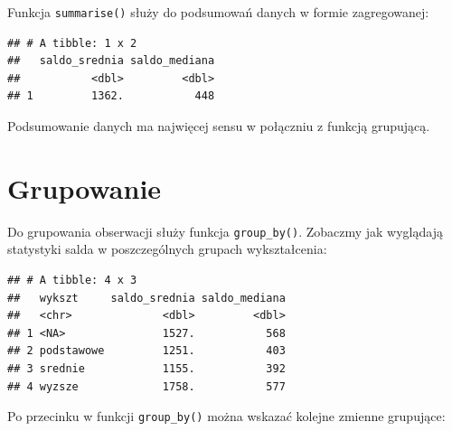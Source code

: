 \documentclass[]{book}
\newenvironment{Shaded}{\begin{snugshade}}{\end{snugshade}}
\newcommand{\KeywordTok}[1]{\textcolor[rgb]{0.13,0.29,0.53}{\textbf{#1}}}
\newcommand{\DataTypeTok}[1]{\textcolor[rgb]{0.13,0.29,0.53}{#1}}
\newcommand{\StringTok}[1]{\textcolor[rgb]{0.31,0.60,0.02}{#1}}
\newcommand{\OperatorTok}[1]{\textcolor[rgb]{0.81,0.36,0.00}{\textbf{#1}}}
\newcommand{\NormalTok}[1]{#1}
\begin{document}
Funkcja \texttt{summarise()} służy do podsumowań danych w formie
zagregowanej:

\begin{Shaded}
\end{Shaded}

\begin{verbatim}
## # A tibble: 1 x 2
##   saldo_srednia saldo_mediana
##           <dbl>         <dbl>
## 1         1362.           448
\end{verbatim}

Podsumowanie danych ma najwięcej sensu w połączniu z funkcją grupującą.

\section{Grupowanie}\label{grupowanie}

Do grupowania obserwacji służy funkcja \texttt{group\_by()}. Zobaczmy
jak wyglądają statystyki salda w poszczególnych grupach wykształcenia:

\begin{Shaded}
\end{Shaded}

\begin{verbatim}
## # A tibble: 4 x 3
##   wykszt     saldo_srednia saldo_mediana
##   <chr>              <dbl>         <dbl>
## 1 <NA>               1527.           568
## 2 podstawowe         1251.           403
## 3 srednie            1155.           392
## 4 wyzsze             1758.           577
\end{verbatim}

Po przecinku w funkcji \texttt{group\_by()} można wskazać kolejne
zmienne grupujące:

\begin{Shaded}
\end{Shaded}
\end{document}
